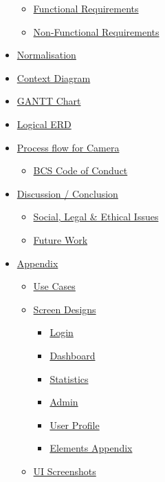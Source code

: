 \documentclass[
  english,
  a4paper,
,tablecaptionabove
]{scrartcl}
\providecommand{\tightlist}{%
  \setlength{\itemsep}{0pt}\setlength{\parskip}{0pt}}
\begin{document}
\begin{itemize}
  \begin{itemize}
  \tightlist
  \item
    \protect\hyperlink{functional-requirements}{Functional Requirements}
  \item
    \protect\hyperlink{non-functional-requirements}{Non-Functional
    Requirements}
  \end{itemize}
\item
  \protect\hyperlink{normalisation}{Normalisation}
\item
  \protect\hyperlink{context-diagram}{Context Diagram}
\item
  \protect\hyperlink{gantt-chart}{GANTT Chart}
\item
  \protect\hyperlink{logical-erd}{Logical ERD}
\item
  \protect\hyperlink{process-flow-for-camera}{Process flow for Camera}

  \begin{itemize}
  \tightlist
  \item
    \protect\hyperlink{bcs-code-of-conduct}{BCS Code of Conduct}
  \end{itemize}
\item
  \protect\hyperlink{discussion--conclusion}{Discussion / Conclusion}

  \begin{itemize}
  \tightlist
  \item
    \protect\hyperlink{social-legal--ethical-issues}{Social, Legal \&
    Ethical Issues}
  \item
    \protect\hyperlink{future-work}{Future Work}
  \end{itemize}
\item
  \protect\hyperlink{appendix}{Appendix}

  \begin{itemize}
  \tightlist
  \item
    \protect\hyperlink{use-cases}{Use Cases}
  \item
    \protect\hyperlink{screen-designs}{Screen Designs}

    \begin{itemize}
    \tightlist
    \item
      \protect\hyperlink{login}{Login}
    \item
      \protect\hyperlink{dashboard}{Dashboard}
    \item
      \protect\hyperlink{statistics}{Statistics}
    \item
      \protect\hyperlink{admin}{Admin}
    \item
      \protect\hyperlink{user-profile}{User Profile}
    \item
      \protect\hyperlink{elements-appendix}{Elements Appendix}
    \end{itemize}
  \item
    \protect\hyperlink{ui-screenshots}{UI Screenshots}


\end{itemize}
\end{itemize}
\end{document}
